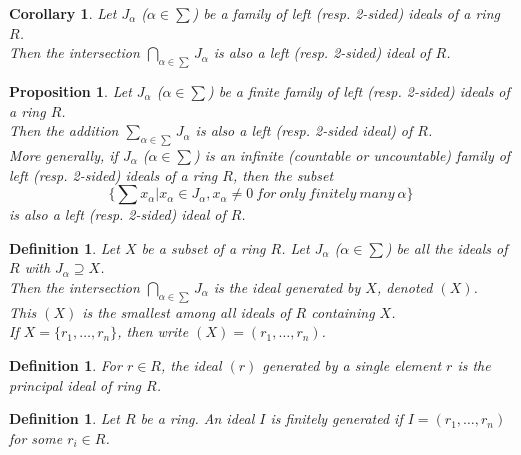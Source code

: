 \documentclass[a4paper,8pt]{article}
\newcommand{\hlt}[1]{\textit{{\color{blue}#1}}}
\theoremstyle{theorem}
\newtheorem{corollary}[theorem]{Corollary}
\newtheorem{proposition}[theorem]{Proposition}
\newtheorem{definition}[theorem]{Definition}
\begin{document}
\begin{corollary}
Let $J_\alpha$ ($\alpha \in \sum$) be a family of left (resp. 2-sided) ideals of a ring $R$.\\
Then the intersection $\bigcap\limits_{\alpha \in \sum}J_\alpha$ is also a left (resp. 2-sided) ideal of $R$.\\
\end{corollary}


\begin{proposition}
Let $J_\alpha$ ($\alpha \in \sum$) be a finite family of left (resp. 2-sided) ideals of a ring $R$.\\
Then the addition $\sum_{\alpha \in \sum} J_\alpha$ is also a left (resp. 2-sided ideal) of $R$.\\
More generally, if $J_\alpha$ ($\alpha \in \sum$) is an infinite (countable or uncountable) family of left (resp. 2-sided) ideals of a ring $R$, then the subset
\begin{equation}
\{\sum x_\alpha | x_\alpha \in J_\alpha, x_\alpha \neq 0 \ for \ only \ finitely \ many \ \alpha\} \nonumber
\end{equation}
is also a left (resp. 2-sided) ideal of $R$.\\
\end{proposition}


\begin{definition}
Let $X$ be a subset of a ring $R$. Let $J_\alpha$ ($\alpha \in \sum$) be all the ideals of $R$ with $J_\alpha \supseteq X$.\\
Then the intersection $\bigcap\limits_{\alpha \in \sum}J_\alpha$ is the \hlt{ideal generated by $X$}, denoted $(X)$.\\
This $(X)$ is the smallest among all ideals of $R$ containing $X$.\\
If $X=\{r_1, \ldots, r_n\}$, then write $(X)=(r_1, \ldots, r_n)$.\\
\end{definition}


\begin{definition}
For $r \in R$, the ideal $(r)$ generated by a single element $r$ is the \hlt{principal ideal of ring $R$}.\\
\end{definition}


\begin{definition}
Let $R$ be a ring. An ideal $I$ is \hlt{finitely generated} if $I=(r_1, \ldots, r_n)$ for some $r_i \in R$.\\
\end{definition}
\end{document}
